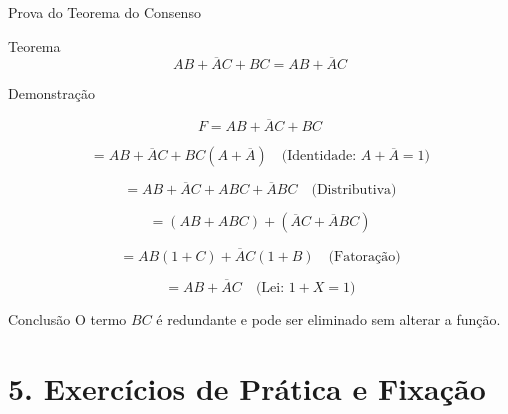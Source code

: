 \documentclass[9pt]{beamer}
\begin{document}
\begin{frame}{Prova do Teorema do Consenso}

\begin{block}{Teorema}
\[
AB + \overline{A}C + BC = AB + \overline{A}C
\]
\end{block}

\vspace{0.2cm}

\begin{alertblock}{Demonstração}

\[
F = AB + \overline{A}C + BC
\]

\[
= AB + \overline{A}C + BC(A + \overline{A})
\quad \text{(Identidade: } A + \overline{A} = 1)
\]

\[
= AB + \overline{A}C + ABC + \overline{A}BC
\quad \text{(Distributiva)}
\]

\[
= (AB + ABC) + (\overline{A}C + \overline{A}BC)
\]

\[
= AB(1 + C) + \overline{A}C(1 + B)
\quad \text{(Fatoração)}
\]

\[
= AB + \overline{A}C
\quad \text{(Lei: } 1 + X = 1)
\]

\end{alertblock}

\vspace{0.2cm}

\begin{block}{Conclusão}
O termo $BC$ é \alert{redundante} e pode ser eliminado sem alterar a função.
\end{block}

\end{frame}
\section{5. Exercícios de Prática e Fixação}
\end{document}
